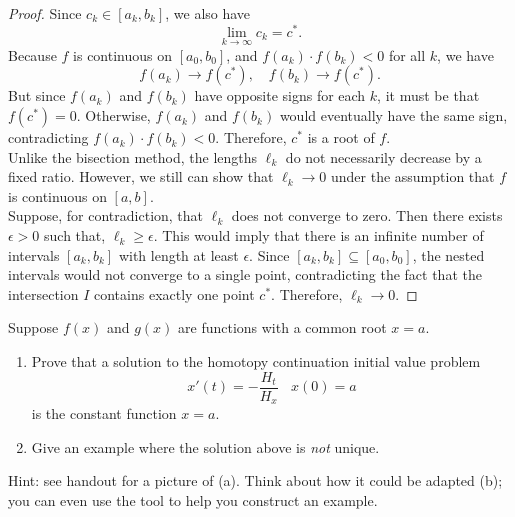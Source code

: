 \documentclass{article}
\begin{document}
\begin{proof}
    Since \( c_k \in [a_k, b_k] \), we also have
    \[
        \lim_{k \to \infty} c_k = c^*.
    \]
    Because \( f \) is continuous on \( [a_0, b_0] \), and \( f(a_k) \cdot f(b_k) < 0 \) for all \( k \), we have
    \[
    f(a_k) \to f(c^*), \quad f(b_k) \to f(c^*).
    \]
    But since \( f(a_k) \) and \( f(b_k) \) have opposite signs for each \( k \), it must be that \( f(c^*) = 0 \). Otherwise, \( f(a_k) \) and \( f(b_k) \) would eventually have the same sign, contradicting \( f(a_k) \cdot f(b_k) < 0 \).
    Therefore, \( c^* \) is a root of \( f \).
    \\
    Unlike the bisection method, the lengths \( \ell_k \) do not necessarily decrease by a fixed ratio. However, we still can show that \( \ell_k \to 0 \) under the assumption that \( f \) is continuous on \( [a, b] \).
    \\
    Suppose, for contradiction, that \( \ell_k \) does not converge to zero. Then there exists \( \epsilon > 0 \) such that, \( \ell_k \geq \epsilon \). This would imply that there is an infinite number of intervals \( [a_k, b_k] \) with length at least \( \epsilon \). Since \( [a_k, b_k] \subseteq [a_0, b_0] \), the nested intervals would not converge to a single point, contradicting the fact that the intersection \( I \) contains exactly one point \( c^* \).
    Therefore, \( \ell_k \to 0 \).
\end{proof}


\begin{problem}
    Suppose \(f(x)\) and \(g(x)\) are functions with a common root \(x=a\).
    \begin{enumerate}[\hspace{2em}a)]
        \item Prove that a solution to the homotopy continuation initial value problem
    \[x'(t) = -\frac{H_t}{H_x}\ \ \ \ x(0) = a\]
    is the constant function \(x=a\).
        \item Give an example where the solution above is \emph{not} unique.
    \end{enumerate}

    Hint: see handout for a picture of (a). Think about how it could be adapted (b); you can even use the tool to help you construct an example.
\end{problem}
\end{document}
